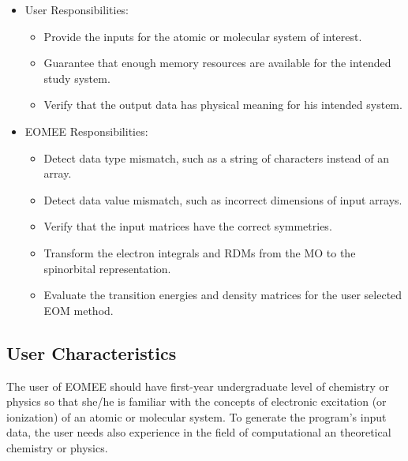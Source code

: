 \documentclass[12pt]{article}
\begin{document}
\begin{itemize}
	\item User Responsibilities:
	\begin{itemize}
		\item Provide the inputs for the atomic or molecular system of interest.
		\item Guarantee that enough memory resources are available for the intended 
		study system.
		\item Verify that the output data has physical meaning for his intended system.
	\end{itemize}
	\item EOMEE Responsibilities:
	\begin{itemize}
		\item Detect data type mismatch, such as a string of characters 
		instead of an array.
		\item Detect data value mismatch, such as incorrect dimensions of input arrays.
		\item Verify that the input matrices have the correct symmetries.
		\item Transform the electron integrals and RDMs from the MO to the spinorbital 
		representation.
		\item Evaluate the transition energies and density matrices for the user 
		selected EOM method.
	\end{itemize}
\end{itemize}

\subsection{User Characteristics} \label{SecUserCharacteristics}


The user of EOMEE should have first-year undergraduate level of chemistry 
or physics so that she/he is familiar with the concepts of electronic 
excitation (or ionization) of an atomic or molecular system. To generate the 
program's input data, the user needs also experience in the field of 
computational an theoretical chemistry or physics.
\end{document}
